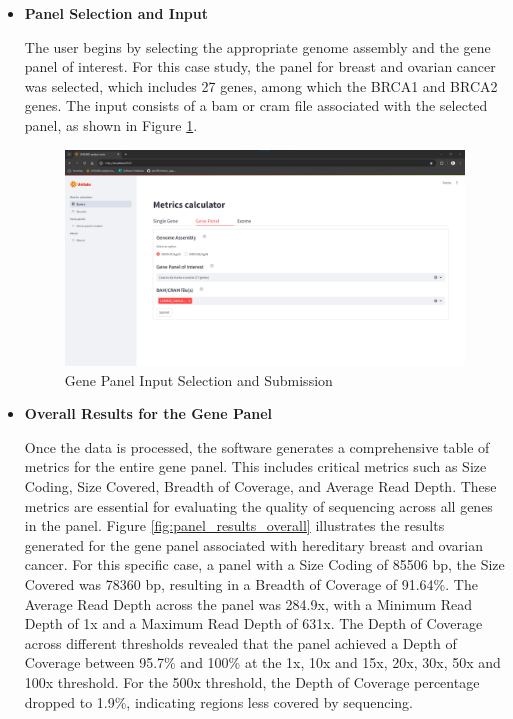 \begin{itemize}
\item \textbf{Panel Selection and Input}

The user begins by selecting the appropriate genome assembly and the gene panel of interest. For this case study, the panel for breast and ovarian cancer was selected, which includes 27 genes, among which the BRCA1 and BRCA2 genes. The input consists of a \ac{bam} or \ac{cram} file associated with the selected panel, as shown in Figure \ref{fig:panel_input}.

\begin{figure}[H]
    \centering
    \includegraphics[width=\textwidth]{figs/v3.8.png}
    \caption{Gene Panel Input Selection and Submission}
    \label{fig:panel_input}
\end{figure}

\item \textbf{Overall Results for the Gene Panel}

Once the data is processed, the software generates a comprehensive table of metrics for the entire gene panel. This includes critical metrics such as Size Coding, Size Covered, Breadth of Coverage, and Average Read Depth. These metrics are essential for evaluating the quality of sequencing across all genes in the panel. Figure \ref{fig:panel_results_overall} illustrates the results generated for the gene panel associated with hereditary breast and ovarian cancer. For this specific case, a panel with a Size Coding of 85506 \ac{bp}, the Size Covered was 78360 \ac{bp}, resulting in a Breadth of Coverage of 91.64\%. The Average Read Depth across the panel was 284.9x, with a Minimum Read Depth of 1x and a Maximum Read Depth of 631x. The Depth of Coverage across different thresholds revealed that the panel achieved a Depth of Coverage between 95.7\% and 100\% at the 1x, 10x and 15x, 20x, 30x, 50x and 100x threshold. For the 500x threshold, the Depth of Coverage percentage dropped to 1.9\%, indicating regions less covered by sequencing. 


\end{itemize}
